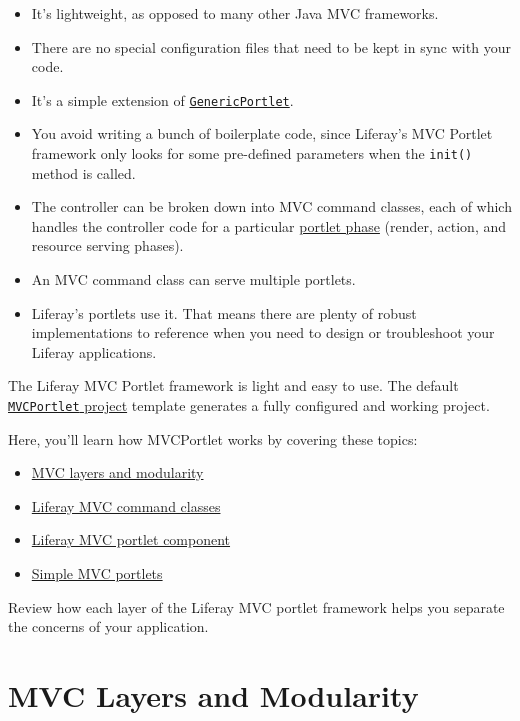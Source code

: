 \begin{itemize}
\tightlist
\item
  It's lightweight, as opposed to many other Java MVC frameworks.
\item
  There are no special configuration files that need to be kept in sync
  with your code.
\item
  It's a simple extension of
  \href{https://docs.liferay.com/portlet-api/3.0/javadocs/javax/portlet/GenericPortlet.html}{\texttt{GenericPortlet}}.
\item
  You avoid writing a bunch of boilerplate code, since Liferay's MVC
  Portlet framework only looks for some pre-defined parameters when the
  \texttt{init()} method is called.
\item
  The controller can be broken down into MVC command classes, each of
  which handles the controller code for a particular
  \href{/docs/7-2/frameworks/-/knowledge_base/f/portlets}{portlet phase}
  (render, action, and resource serving phases).
\item
  An MVC command class can serve multiple portlets.
\item
  Liferay's portlets use it. That means there are plenty of robust
  implementations to reference when you need to design or troubleshoot
  your Liferay applications.
\end{itemize}

The Liferay MVC Portlet framework is light and easy to use. The default
\href{/docs/7-2/reference/-/knowledge_base/r/using-the-mvc-portlet-template}{\texttt{MVCPortlet}
project} template generates a fully configured and working project.

Here, you'll learn how MVCPortlet works by covering these topics:

\begin{itemize}
\tightlist
\item
  \hyperref[mvc-layers-and-modularity]{MVC layers and modularity}
\item
  \hyperref[liferay-mvc-command-classes]{Liferay MVC command classes}
\item
  \hyperref[liferay-mvc-portlet-component]{Liferay MVC portlet
  component}
\item
  \hyperref[a-simpler-mvc-portlet]{Simple MVC portlets}
\end{itemize}

Review how each layer of the Liferay MVC portlet framework helps you
separate the concerns of your application.

\section{MVC Layers and Modularity}\label{mvc-layers-and-modularity}

